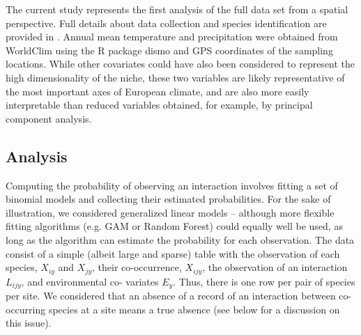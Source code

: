 \documentclass[12pt]{article}
\begin{document}
The current study represents the first analysis of the full data set
from a spatial perspective. Full details about data collection and species
identification are provided in \citep{Kopelke2017}. Annual mean temperature
and precipitation were obtained from WorldClim using the R package dismo
\citep{Hijmans2015} and GPS coordinates of the sampling locations. While other
covariates could have also been considered to represent the high
dimensionality of the niche, these two variables are likely representative of
the most important axes of European climate, and are also more easily
interpretable than reduced variables obtained, for example, by principal
component analysis.

\subsection*{Analysis}

Computing the probability of observing an interaction involves fitting a set
of binomial models and collecting their estimated probabilities. For the sake
of illustration, we considered generalized linear models – although more
flexible fitting algorithms (e.g. GAM or Random Forest) could equally well be
used, as long as the algorithm can estimate the probability for each
observation. The data consist of a simple (albeit large and sparse) table with
the observation of each species, $X_{iy}$ and $X_{jy}$, their co-occurrence,
$X_{ijy}$, the observation of an interaction $L_{ijy}$, and environmental co-
variates $E_y$. Thus, there is one row per pair of species per site. We
considered that an absence of a record of an interaction between co-occurring
species at a site means a true absence (see below for a discussion on this
issue).
\end{document}
